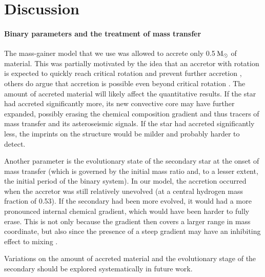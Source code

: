 \documentclass[desactivate]{aa}
\begin{document}
\section{Discussion}
\label{sec:caveats}

\paragraph{Binary parameters and the treatment of mass transfer} The mass-gainer model that we use was allowed to accrete only 0.5$\,{\rm M_\odot}$ of material. This was partially motivated by the idea that an accretor with rotation is expected to quickly reach critical rotation and prevent further accretion \citep[e.g.][]{Petrovic+2005}, others do argue that accretion is possible even beyond critical rotation \citep{Popham+1991, Paczynski+1991}. The amount of accreted material will likely affect the quantitative results. If the star had accreted significantly more, its new convective core may have further expanded, possibly erasing the chemical composition gradient and thus tracers of mass transfer and its asteroseismic signals. If the star had accreted significantly less, the imprints on the structure would be milder and probably harder to detect.  

Another parameter is the evolutionary state of the secondary star at the onset of mass transfer (which is governed by the initial mass ratio and, to a lesser extent, the initial period of the binary system). In our model, the accretion occurred when the accretor was still relatively unevolved (at a central hydrogen mass fraction of 0.53). If the secondary had been more evolved, it would had a more pronounced internal chemical gradient, which would have been harder to fully erase. This is not only because the gradient then covers a larger range in mass coordinate, but also since the presence of a steep gradient may have an inhibiting effect to mixing \citep{Braun+1995}. 

Variations on the amount of accreted material and the evolutionary stage of the secondary should be explored systematically in future work. 


\end{document}
